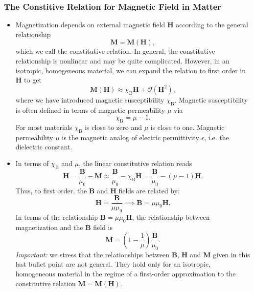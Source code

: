 \documentclass[11pt, a4paper]{article}
\renewcommand{\vec}[1]{\bm{#1}} %
\newcommand{\B}{\vec{B}} %
\renewcommand{\H}{\vec{H}}  %
\newcommand{\M}{\vec{M}}  %
\newcommand{\mm}{\mu_{0}}  %
\begin{document}
\subsubsection{The Constitive Relation for Magnetic Field in Matter}
\begin{itemize}
	\item Magnetization depends on external magnetic field $ \H $ according to the general relationship
	\begin{equation*}
		\M = \M(\H),
	\end{equation*}
	which we call the constitutive relation. In general, the constitutive relationship is nonlinear and may be quite complicated. However, in an isotropic, homogeneous material, we can expand the relation to first order in $ \H $ to get
	\begin{equation*}
		\M(\H) \approx \chi_{\text{B}} \H + \mathcal{O}(\H^{2}),
	\end{equation*}
    where we have introduced magnetic susceptibility $ \chi_{\text{B}} $. Magnetic susceptibility is often defined in terms of magnetic permeability $ \mu $ via
	\begin{equation*}
		\chi_{\text{B}} = \mu - 1.
	\end{equation*}
    For most materials $ \chi_{\text{B}} $ is close to zero and $ \mu $ is close to one. Magnetic permeability $ \mu $ is the magnetic analog of electric permittivity $ \epsilon $, i.e. the dielectric constant.
	
	\item In terms of $ \chi_{\text{B}} $ and $ \mu $, the linear constitutive relation reads
	\begin{equation*}
        \H = \frac{\B}{\mm} - \M \approx \frac{\B}{\mm} - \chi_{\text{B}} \H = \frac{\B}{\mm} - (\mu - 1)\H.
	\end{equation*}
	Thus, to first order, the $ \B $ and $ \H $ fields are related by:
	\begin{equation*}
		\H = \frac{\B}{\mu \mm} \implies \B = \mu \mm \H.
	\end{equation*}
    In terms of the relationship $ \B = \mu \mm \H $, the relationship between magnetization and the $ \B $ field is
	\begin{equation*}
		\M = \left(1 - \frac{1}{\mu}\right)\frac{\B}{\mm}.
	\end{equation*}
    \textit{Important:} we stress that the relationships between $ \B $, $ \H $ and $ \M $ given in this last bullet point are not general. They hold only for an isotropic, homogeneous material in the regime of a first-order approximation to the constitutive relation $ \M = \M(\H) $.
	
\end{itemize}
\end{document}
